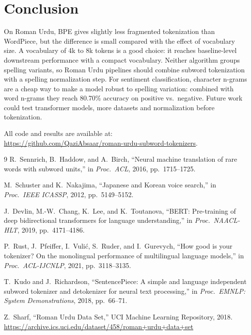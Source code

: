 \documentclass[11pt,a4paper]{article}
\begin{document}
\section{Conclusion}
On Roman Urdu, BPE gives slightly less fragmented tokenization than WordPiece, but the difference is small compared with the effect of vocabulary size. A vocabulary of 4k to 8k tokens is a good choice: it reaches baseline-level downstream performance with a compact vocabulary. Neither algorithm groups spelling variants, so Roman Urdu pipelines should combine subword tokenization with a spelling normalization step. For sentiment classification, character n-grams are a cheap way to make a model robust to spelling variation: combined with word n-grams they reach 80.70\% accuracy on positive vs.\ negative. Future work could test transformer models, more datasets and normalization before tokenization.

All code and results are available at:\\ \url{https://github.com/QaziAbsaar/roman-urdu-subword-tokenizers}.

\begin{thebibliography}{9}
R.~Sennrich, B.~Haddow, and A.~Birch, ``Neural machine translation of rare words with subword units,'' in \textit{Proc.\ ACL}, 2016, pp.~1715--1725.

M.~Schuster and K.~Nakajima, ``Japanese and Korean voice search,'' in \textit{Proc.\ IEEE ICASSP}, 2012, pp.~5149--5152.

J.~Devlin, M.-W.~Chang, K.~Lee, and K.~Toutanova, ``BERT: Pre-training of deep bidirectional transformers for language understanding,'' in \textit{Proc.\ NAACL-HLT}, 2019, pp.~4171--4186.

P.~Rust, J.~Pfeiffer, I.~Vuli\'c, S.~Ruder, and I.~Gurevych, ``How good is your tokenizer? On the monolingual performance of multilingual language models,'' in \textit{Proc.\ ACL-IJCNLP}, 2021, pp.~3118--3135.

T.~Kudo and J.~Richardson, ``SentencePiece: A simple and language independent subword tokenizer and detokenizer for neural text processing,'' in \textit{Proc.\ EMNLP: System Demonstrations}, 2018, pp.~66--71.

Z.~Sharf, ``Roman Urdu Data Set,'' UCI Machine Learning Repository, 2018. \url{https://archive.ics.uci.edu/dataset/458/roman+urdu+data+set}
\end{thebibliography}
\end{document}
